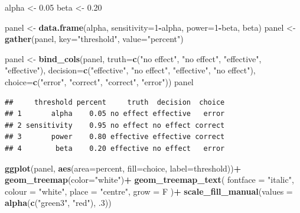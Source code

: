 \documentclass[]{book}
\newenvironment{Shaded}{\begin{snugshade}}{\end{snugshade}}
\newcommand{\DataTypeTok}[1]{\textcolor[rgb]{0.13,0.29,0.53}{#1}}
\newcommand{\DecValTok}[1]{\textcolor[rgb]{0.00,0.00,0.81}{#1}}
\newcommand{\FloatTok}[1]{\textcolor[rgb]{0.00,0.00,0.81}{#1}}
\newcommand{\KeywordTok}[1]{\textcolor[rgb]{0.13,0.29,0.53}{\textbf{#1}}}
\newcommand{\NormalTok}[1]{#1}
\newcommand{\OperatorTok}[1]{\textcolor[rgb]{0.81,0.36,0.00}{\textbf{#1}}}
\newcommand{\StringTok}[1]{\textcolor[rgb]{0.31,0.60,0.02}{#1}}
\begin{document}
\begin{Shaded}
\begin{Highlighting}[]
\NormalTok{alpha <-}\StringTok{ }\FloatTok{0.05}
\NormalTok{beta <-}\StringTok{ }\FloatTok{0.20}

\NormalTok{panel <-}\StringTok{ }\KeywordTok{data.frame}\NormalTok{(alpha, }
                    \DataTypeTok{sensitivity=}\DecValTok{1}\OperatorTok{-}\NormalTok{alpha, }
                    \DataTypeTok{power=}\DecValTok{1}\OperatorTok{-}\NormalTok{beta, }
\NormalTok{                    beta)}
\NormalTok{panel <-}\StringTok{ }\KeywordTok{gather}\NormalTok{(panel, }\DataTypeTok{key=}\StringTok{"threshold"}\NormalTok{, }
         \DataTypeTok{value=}\StringTok{"percent"}\NormalTok{) }

\NormalTok{panel <-}\StringTok{ }\KeywordTok{bind_cols}\NormalTok{(panel, }
                   \DataTypeTok{truth=}\KeywordTok{c}\NormalTok{(}\StringTok{"no effect"}\NormalTok{, }\StringTok{"no effect"}\NormalTok{, }\StringTok{"effective"}\NormalTok{, }\StringTok{"effective"}\NormalTok{), }
                   \DataTypeTok{decision=}\KeywordTok{c}\NormalTok{(}\StringTok{"effective"}\NormalTok{, }\StringTok{"no effect"}\NormalTok{, }\StringTok{"effective"}\NormalTok{, }\StringTok{"no effect"}\NormalTok{), }
                   \DataTypeTok{choice=}\KeywordTok{c}\NormalTok{(}\StringTok{"error"}\NormalTok{, }\StringTok{"correct"}\NormalTok{, }\StringTok{"correct"}\NormalTok{, }\StringTok{"error"}\NormalTok{))}
\NormalTok{panel}
\end{Highlighting}
\end{Shaded}

\begin{verbatim}
##     threshold percent     truth  decision  choice
## 1       alpha    0.05 no effect effective   error
## 2 sensitivity    0.95 no effect no effect correct
## 3       power    0.80 effective effective correct
## 4        beta    0.20 effective no effect   error
\end{verbatim}

\begin{Shaded}
\begin{Highlighting}[]
\KeywordTok{ggplot}\NormalTok{(panel, }\KeywordTok{aes}\NormalTok{(}\DataTypeTok{area=}\NormalTok{percent, }\DataTypeTok{fill=}\NormalTok{choice, }\DataTypeTok{label=}\NormalTok{threshold))}\OperatorTok{+}
\StringTok{  }\KeywordTok{geom_treemap}\NormalTok{(}\DataTypeTok{color=}\StringTok{"white"}\NormalTok{)}\OperatorTok{+}
\StringTok{  }\KeywordTok{geom_treemap_text}\NormalTok{(}
    \DataTypeTok{fontface =} \StringTok{"italic"}\NormalTok{,}
    \DataTypeTok{colour =} \StringTok{"white"}\NormalTok{,}
    \DataTypeTok{place =} \StringTok{"centre"}\NormalTok{,}
    \DataTypeTok{grow =}\NormalTok{ F}
\NormalTok{  )}\OperatorTok{+}
\StringTok{  }\KeywordTok{scale_fill_manual}\NormalTok{(}\DataTypeTok{values =} \KeywordTok{alpha}\NormalTok{(}\KeywordTok{c}\NormalTok{(}\StringTok{"green3"}\NormalTok{, }\StringTok{"red"}\NormalTok{), }\FloatTok{.3}\NormalTok{))}
\end{Highlighting}
\end{Shaded}
\end{document}
